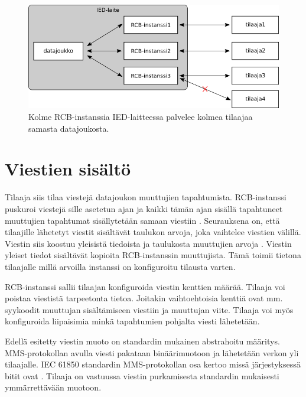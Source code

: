 \begin{figure}[ht!]
	\includegraphics[width=1\textwidth]{pictures/rcbs-to-one-dataset.png}
	\caption{Kolme RCB-instanssia IED-laitteessa palvelee kolmea tilaajaa samasta datajoukosta.}
	\label{fig:rcb-to-one-dataset}
\end{figure}


\section{Viestien sisältö}
Tilaaja siis tilaa viestejä datajoukon muuttujien tapahtumista. RCB-instanssi puskuroi viestejä sille asetetun ajan ja kaikki tämän ajan sisällä tapahtuneet muuttujien tapahtumat sisällytetään samaan viestiin \cite[s.~98]{IEC61850-7-2}. Seurauksena on, että tilaajille lähetetyt viestit sisältävät taulukon arvoja, joka vaihtelee viestien välillä. Viestin siis koostuu yleisistä tiedoista ja taulukosta muuttujien arvoja \cite[s.~104]{IEC61850-7-2}. Viestin yleiset tiedot sisältävät kopioita RCB-instanssin muuttujista. Tämä toimii tietona tilaajalle millä arvoilla instanssi on konfiguroitu tilausta varten.

RCB-instanssi sallii tilaajan konfiguroida viestin kenttien määrää. Tilaaja voi poistaa viestistä tarpeetonta tietoa. Joitakin vaihtoehtoisia kenttiä ovat mm. syykoodit muuttujan sisältämiseen viestiin ja muuttujan viite. Tilaaja voi myös konfiguroida liipaisimia minkä tapahtumien pohjalta viesti lähetetään. \mbox{\cite[s.~90]{IEC61850-7-1}} \mbox{\cite[s.~98]{IEC61850-7-2}}

Edellä esitetty viestin muoto on standardin mukainen abstrahoitu määritys. MMS-pro\-to\-kol\-lan avulla viesti pakataan binäärimuotoon ja lähetetään verkon yli tilaajalle. IEC 61850 standardin MMS-pro\-to\-kol\-lan osa kertoo missä järjestyksessä bitit ovat \cite{IEC61850-8-1}. Tilaaja on vastuussa viestin purkamisesta standardin mukaisesti ymmärrettävään muotoon.



